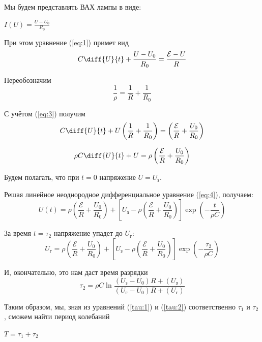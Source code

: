 Мы будем представлять ВАХ лампы в виде:


\begin{center}
$I(U)=\frac{U-U_0}{R_0}$
	\end{center}

При этом уравнение (\ref{eq:1}) примет вид
\begin{equation}
C\diff{U}{t}+\frac{U-U_0}{R_0} = \frac{\mathcal{E}-U}{R}
	\end{equation}

Переобозначим 
\begin{equation}
\label{eq:3}
\frac{1}{\rho}=\frac{1}{R}+\frac{1}{R_0}
	\end{equation}

С учётом (\ref{eq:3}) получим
\begin{equation}
	C \diff{U}{t} +U \left( \frac{1}{R}+\frac{1}{R_0} \right)= \left( \frac{\mathcal{E}}{R}+\frac{U_0}{R_0}\right)
	\end{equation}

\begin{equation}
	\label{eq:4}
	\rho C \diff{U}{t}+U= \rho \left( \frac{\mathcal{E}}{R}+\frac{U_0}{R_0}\right)
	\end{equation}

Будем полагать, что при $t=0$ напряжение $U=U_{\text{з}}$.

Решая линейное неоднородное дифференциальное уравнение (\ref{eq:4}), получаем:
\begin{equation}
	U(t)=\rho \left(\frac{\mathcal{E}}{R}+\frac{U_0}{R_0} \right)+ \left[U_{\text{з}}- \rho\left(\frac{\mathcal{E}}{R}+\frac{U_0}{R_0} \right)\right]\exp{\left( - \frac{t}{\rho C} \right)} 
\end{equation}

За время $t=\tau_2$ напряжение упадет до $U_{\text{г}}$:
\begin{equation}
	U_{\text{г}}=\rho \left(\frac{\mathcal{E}}{R}+\frac{U_0}{R_0} \right)+ \left[U_{\text{з}}- \rho\left(\frac{\mathcal{E}}{R}+\frac{U_0}{R_0} \right)\right]\exp{\left( - \frac{\tau_2}{\rho C} \right)} 
\end{equation}

И, окончательно, это нам даст время разрядки 
\begin{equation}
\label{tau:2}
	\tau_2 =  \rho C \ln { 
	\frac{(U_{\text{з}}  -  U_0) R+ (U_{\text{з}})}
	{(U_{\text{г}}  -  U_0) R+ (U_{\text{г}})}
	}
\end{equation}

Таким образом, мы, зная из уравнений (\ref{tau:1}) и (\ref{tau:2}) соответственно $\tau_1$ и $\tau_2$, сможем найти период колебаний
\begin{center}
$T=\tau_1+\tau_2$
\end{center}
\newpage
